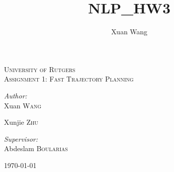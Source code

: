 \documentclass[12pt]{amsart}
\title{NLP_HW3}
\author{Xuan Wang}
\date{} %
\begin{document}
\begin{titlepage}

\begin{center}



\textsc{\LARGE University of Rutgers}\\[1.5cm]

\textsc{\Large Assignment 1: Fast Trajectory Planning}\\[0.5cm]


\begin{minipage}{0.4\textwidth}
\begin{flushleft} \large
\emph{Author:}\\
Xuan \textsc{Wang}

Xunjie \textsc{Zhu}
\end{flushleft}
\end{minipage}
\begin{minipage}{0.4\textwidth}
\begin{flushright} \large
\emph{Supervisor:} \\
Abdeslam  \textsc{Boularias}
\end{flushright}
\end{minipage}

\vfill

{\large \today}

\end{center}

\end{titlepage}

%
%
\end{document}
